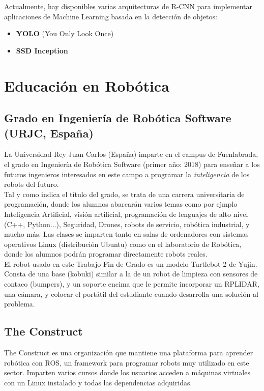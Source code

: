 Actualmente, hay disponibles varias arquitecturas de R-CNN para implementar aplicaciones de Machine Learning basada en la detección de objetos:

\begin{itemize}
	\item \textbf{YOLO} (You Only Look Once)
	\item \textbf{SSD Inception}
\end{itemize}


\section{Educación en Robótica}
\label{sec:educacion_robotica}

\subsection{Grado en Ingeniería de Robótica Software (URJC, España)}
\label{subsec:grado_robotica_software}
La Universidad Rey Juan Carlos (España) imparte en el campus de Fuenlabrada, el grado en Ingeniería de Robótica Software (primer año: 2018) para enseñar a los futuros ingenieros interesados en este campo a programar la \textit{inteligencia} de los robots del futuro.\\

Tal y como indica el título del grado, se trata de una carrera universitaria de programación, donde los alumnos abarcarán varios temas como por ejmplo Inteligencia Artificial, visión artificial, programación de lenguajes de alto nivel (C++, Python...), Seguridad, Drones, robots de servicio, robótica industrial, y mucho más. Las clases se imparten tanto en salas de ordenadores con sistemas operativos Linux (distribución Ubuntu) como en el laboratorio de Robótica, donde los alumnos podrán programar directamente robots reales.\\

El robot usado en este Trabajo Fin de Grado es un modelo Turtlebot 2 de Yujin. Consta de una base (kobuki) similar a la de un robot de limpieza con sensores de contaco (bumpers), y un soporte encima que le permite incorporar un RPLIDAR, una cámara, y colocar el portátil del estudiante cuando desarrolla una solución al problema.

\subsection{The Construct}
\label{sec:the_construct}
The Construct es una organización que mantiene una plataforma para aprender robótica con ROS, un framework para programar robots muy utilizado en este sector. Imparten varios cursos donde los usuarios acceden a máquinas virtuales con un Linux instalado y todas las dependencias adquiridas.\\


